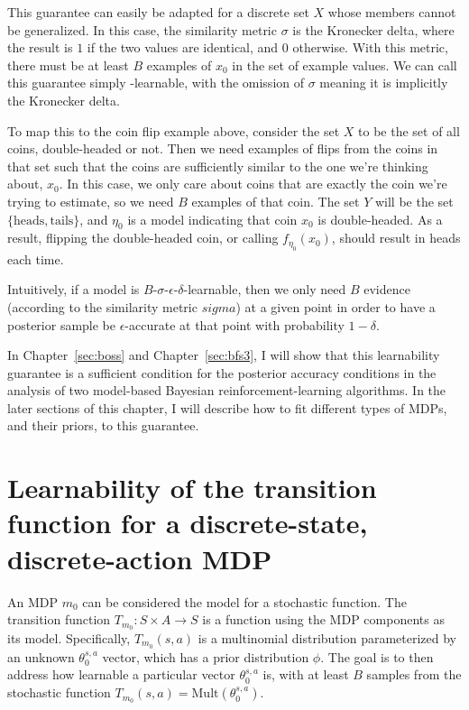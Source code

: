 This guarantee can easily be adapted for a discrete set $X$ whose members cannot be generalized. In this case, the similarity metric $\sigma$ is the Kronecker delta, where the result is $1$ if the two values are identical, and $0$ otherwise. With this metric, there must be at least $B$ examples of $x_0$ in the set of example values. We can call this guarantee simply \bed-learnable, with the omission of $\sigma$ meaning it is implicitly the Kronecker delta.


To map this to the coin flip example above, consider the set $X$ to be the set of all coins, double-headed or not. Then we need examples of flips from the coins in that set such that the coins are sufficiently similar to the one we're thinking about, $x_0$. In this case, we only care about coins that are exactly the coin we're trying to estimate, so we need $B$ examples of that coin. The set $Y$ will be the set $\{\mbox{heads},\mbox{tails}\}$, and $\eta_0$ is a model indicating that coin $x_0$ is double-headed. As a result, flipping the double-headed coin, or calling $f_{\eta_0}(x_0)$, should result in heads each time.

Intuitively, if a model is $B$-$\sigma$-$\epsilon$-$\delta$-learnable, then we only need $B$ evidence (according to the similarity metric $sigma$) at a given point in order to have a posterior sample be $\epsilon$-accurate at that point with probability $1-\delta$.

In Chapter~\ref{sec:boss} and Chapter~\ref{sec:bfs3}, I will show that this learnability guarantee is a sufficient condition for the posterior accuracy conditions in the analysis of two model-based Bayesian reinforcement-learning algorithms. In the later sections of this chapter, I will describe how to fit different types of MDPs, and their priors, to this guarantee.

\section{Learnability of the transition function for a discrete-state, discrete-action MDP}

An MDP $m_0$ can be considered the model for a stochastic function. The transition function $T_{m_0}:S \times A \rightarrow S$ is a function using the MDP components as its model. Specifically, $T_{m_0}(s,a)$ is a multinomial distribution parameterized by an unknown $\theta_0^{s,a}$ vector, which has a prior distribution $\phi$. The goal is to then address how learnable a particular vector $\theta_0^{s,a}$ is, with at least $B$ samples from the stochastic function $T_{m_0}(s,a) = \mbox{Mult}(\theta_0^{s,a})$.

